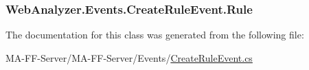 \subsubsection[{Rule}]{ Web\+Analyzer.\+Events.\+Create\+Rule\+Event.\+Rule\hspace{0.3cm}{\ttfamily [get]}}\label{class_web_analyzer_1_1_events_1_1_create_rule_event_a71f6a5e08aac9efa2b7da9052f8890e3}


The documentation for this class was generated from the following file\+:\begin{DoxyCompactItemize}
\item 
M\+A-\/\+F\+F-\/\+Server/\+M\+A-\/\+F\+F-\/\+Server/\+Events/\hyperlink{_create_rule_event_8cs}{Create\+Rule\+Event.\+cs}\end{DoxyCompactItemize}
